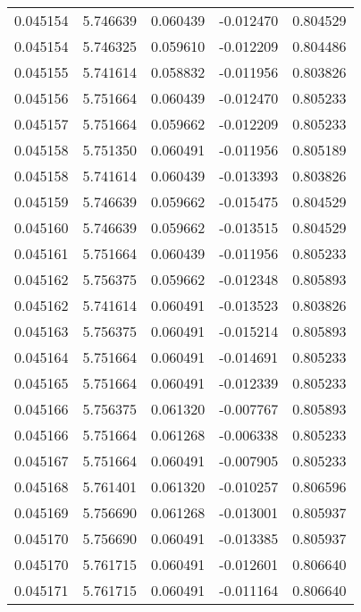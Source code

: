\begin{tabular}{lrrrr}
0.045154    &  5.746639 &  0.060439 & -0.012470 &             0.804529 \\
0.045154    &  5.746325 &  0.059610 & -0.012209 &             0.804486 \\
0.045155    &  5.741614 &  0.058832 & -0.011956 &             0.803826 \\
0.045156    &  5.751664 &  0.060439 & -0.012470 &             0.805233 \\
0.045157    &  5.751664 &  0.059662 & -0.012209 &             0.805233 \\
0.045158    &  5.751350 &  0.060491 & -0.011956 &             0.805189 \\
0.045158    &  5.741614 &  0.060439 & -0.013393 &             0.803826 \\
0.045159    &  5.746639 &  0.059662 & -0.015475 &             0.804529 \\
0.045160    &  5.746639 &  0.059662 & -0.013515 &             0.804529 \\
0.045161    &  5.751664 &  0.060439 & -0.011956 &             0.805233 \\
0.045162    &  5.756375 &  0.059662 & -0.012348 &             0.805893 \\
0.045162    &  5.741614 &  0.060491 & -0.013523 &             0.803826 \\
0.045163    &  5.756375 &  0.060491 & -0.015214 &             0.805893 \\
0.045164    &  5.751664 &  0.060491 & -0.014691 &             0.805233 \\
0.045165    &  5.751664 &  0.060491 & -0.012339 &             0.805233 \\
0.045166    &  5.756375 &  0.061320 & -0.007767 &             0.805893 \\
0.045166    &  5.751664 &  0.061268 & -0.006338 &             0.805233 \\
0.045167    &  5.751664 &  0.060491 & -0.007905 &             0.805233 \\
0.045168    &  5.761401 &  0.061320 & -0.010257 &             0.806596 \\
0.045169    &  5.756690 &  0.061268 & -0.013001 &             0.805937 \\
0.045170    &  5.756690 &  0.060491 & -0.013385 &             0.805937 \\
0.045170    &  5.761715 &  0.060491 & -0.012601 &             0.806640 \\
0.045171    &  5.761715 &  0.060491 & -0.011164 &             0.806640 \\

\end{tabular}

